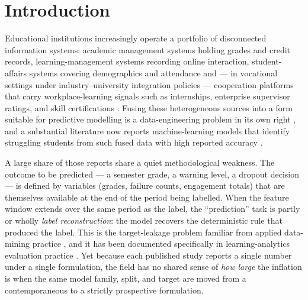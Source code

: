 \documentclass[sn-mathphys,Numbered]{sn-jnl}
\begin{document}

\maketitle

\section{Introduction}\label{sec:intro}

Educational institutions increasingly operate a portfolio of disconnected information systems: academic management systems holding grades and credit records, learning-management systems recording online interaction, student-affairs systems covering demographics and attendance and --- in vocational settings under industry--university integration policies --- cooperation platforms that carry workplace-learning signals such as internships, enterprise supervisor ratings, and skill certifications \cite{Daniel2015,Ferguson2012,Liu2023}. Fusing these heterogeneous sources into a form suitable for predictive modelling is a data-engineering problem in its own right \cite{Gasevic2015}, and a substantial literature now reports machine-learning models that identify struggling students from such fused data with high reported accuracy \cite{Romero2020,Hellas2018,ZawackiRichter2019}.

A large share of those reports share a quiet methodological weakness. The outcome to be predicted --- a semester grade, a warning level, a dropout decision --- is defined by variables (grades, failure counts, engagement totals) that are themselves available at the end of the period being labelled. When the feature window extends over the same period as the label, the ``prediction'' task is partly or wholly \emph{label reconstruction}: the model recovers the deterministic rule that produced the label. This is the target-leakage problem familiar from applied data-mining practice \cite{Kaufman2012,Kapoor2023}, and it has been documented specifically in learning-analytics evaluation practice \cite{Hellas2018,Whitehill2015}. Yet because each published study reports a single number under a single formulation, the field has no shared sense of \emph{how large} the inflation is when the same model family, split, and target are moved from a contemporaneous to a strictly prospective formulation.
\end{document}
